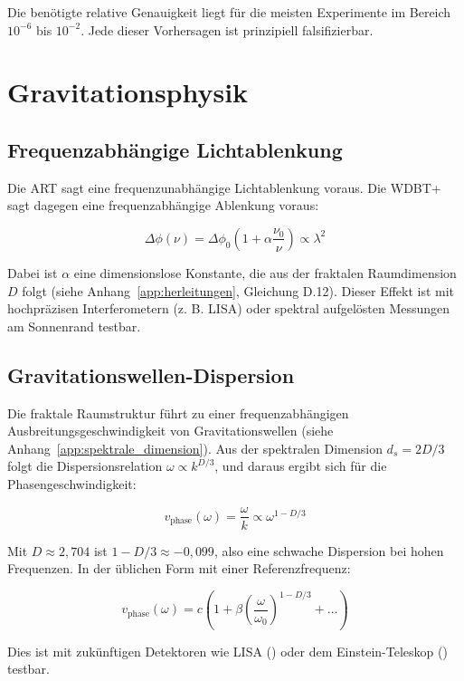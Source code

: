 Die benötigte relative Genauigkeit liegt für die meisten Experimente im Bereich \( 10^{-6} \) bis \( 10^{-2} \). Jede dieser Vorhersagen ist prinzipiell falsifizierbar.

\section{Gravitationsphysik}
\label{sec:vorh_gravitation}

\subsection{Frequenzabhängige Lichtablenkung}
\label{sub:vorh_lichtablenkung}

Die ART sagt eine frequenzunabhängige Lichtablenkung voraus. Die WDBT+ sagt dagegen eine frequenzabhängige Ablenkung voraus:

\[
\Delta\phi(\nu) = \Delta\phi_0 \left(1 + \alpha \frac{\nu_0}{\nu}\right) \propto \lambda^2
\]

Dabei ist \( \alpha \) eine dimensionslose Konstante, die aus der fraktalen Raumdimension \( D \) folgt (siehe Anhang~\ref{app:herleitungen}, Gleichung D.12). Dieser Effekt ist mit hochpräzisen Interferometern (z. B. LISA) oder spektral aufgelösten Messungen am Sonnenrand testbar.

\subsection{Gravitationswellen-Dispersion}
\label{sub:vorh_gw_dispersion}

Die fraktale Raumstruktur führt zu einer frequenzabhängigen Ausbreitungsgeschwindigkeit von Gravitationswellen (siehe Anhang~\ref{app:spektrale_dimension}). Aus der spektralen Dimension \( d_s = 2D/3 \) folgt die Dispersionsrelation \( \omega \propto k^{D/3} \), und daraus ergibt sich für die Phasengeschwindigkeit:

\[
v_{\text{phase}}(\omega) = \frac{\omega}{k} \propto \omega^{1 - D/3}
\]

Mit \( D \approx 2,704 \) ist \( 1 - D/3 \approx -0,099 \), also eine schwache Dispersion bei hohen Frequenzen. In der üblichen Form mit einer Referenzfrequenz:

\[
v_{\text{phase}}(\omega) = c \left(1 + \beta \left(\frac{\omega}{\omega_0}\right)^{1 - D/3} + \dots\right)
\]

Dies ist mit zukünftigen Detektoren wie LISA (\cite{LISA2017}) oder dem Einstein-Teleskop (\cite{EinsteinTeleskop2010}) testbar.

